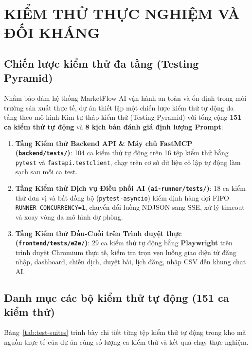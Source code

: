 \chapter{KIỂM THỬ THỰC NGHIỆM VÀ ĐỐI KHÁNG}

\section{Chiến lược kiểm thử đa tầng (Testing Pyramid)}

Nhằm bảo đảm hệ thống MarketFlow AI vận hành an toàn và ổn định trong môi trường sản xuất thực tế, dự án thiết lập một chiến lược kiểm thử tự động đa tầng theo mô hình Kim tự tháp kiểm thử (Testing Pyramid) với tổng cộng \textbf{151 ca kiểm thử tự động} và \textbf{8 kịch bản đánh giá định lượng Prompt}:
\begin{enumerate}[noitemsep,topsep=2pt]
 \item \textbf{Tầng Kiểm thử Backend API \& Máy chủ FastMCP (\texttt{backend/tests/})}: 104 ca kiểm thử tự động trên 16 tệp kiểm thử bằng \texttt{pytest} và \texttt{fastapi.testclient}, chạy trên cơ sở dữ liệu cô lập tự động làm sạch sau mỗi ca test.
 \item \textbf{Tầng Kiểm thử Dịch vụ Điều phối AI (\texttt{ai-runner/tests/})}: 18 ca kiểm thử đơn vị và bất đồng bộ (\texttt{pytest-asyncio}) kiểm định hàng đợi FIFO \texttt{RUNNER\_CONCURRENCY=1}, chuyển đổi luồng NDJSON sang SSE, xử lý timeout và xoay vòng đa mô hình dự phòng.
 \item \textbf{Tầng Kiểm thử Đầu-Cuối trên Trình duyệt thực (\texttt{frontend/tests/e2e/})}: 29 ca kiểm thử tự động bằng \textbf{Playwright} trên trình duyệt Chromium thực tế, kiểm tra trọn vẹn luồng giao diện từ đăng nhập, dashboard, chiến dịch, duyệt bài, lịch đăng, nhập CSV đến khung chat AI.
\end{enumerate}

\section{Danh mục các bộ kiểm thử tự động (151 ca kiểm thử)}

Bảng~\ref{tab:test-suites} trình bày chi tiết từng tệp kiểm thử tự động trong kho mã nguồn thực tế của dự án cùng số lượng ca kiểm thử và kết quả chạy thực nghiệm.

